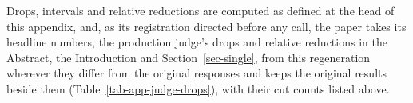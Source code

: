 Drops, intervals and relative reductions are computed as defined at the head
of this appendix, and, as its registration directed before any call, the
paper takes its headline numbers, the production judge's drops and relative
reductions in the Abstract, the Introduction and Section~\ref{sec-single},
from this regeneration wherever they differ from the original responses and
keeps the original results beside them (Table~\ref{tab-app-judge-drops}),
with their cut counts listed above.

